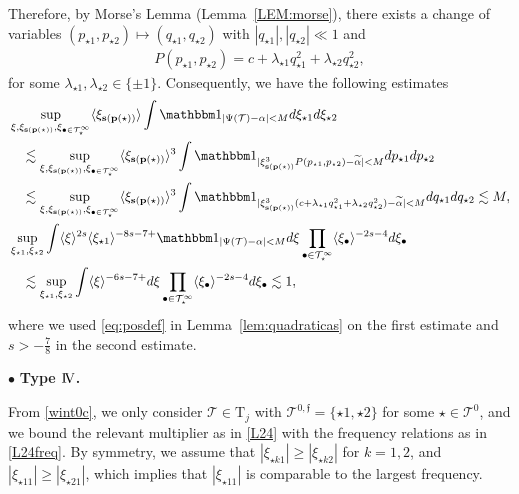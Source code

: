 \documentclass[%
11pt,  reqno]{amsart}
\newcommand{\IV}{\textup{I \hspace{-2.9mm} V}}
\newcommand{\5}{\textup{V}}
\newcommand{\noi}{\noindent}
\newcommand{\ind}{\mathbbm 1}
\newcommand{\les}{\lesssim}
\newcommand{\wt}{\widetilde}
\theoremstyle{remark}
\newcommand{\bul}{\bullet}
\newcommand{\TT}{\mathcal{T}}
\newcommand{\Tr}{\mathrm{T}}
\newcommand{\al}{\alpha}
\newcommand{\ld}{\lambda}
\newcommand{\pb}{\mathbf{p}}
\newcommand{\sbf}{\mathbf{s}}
\newcommand{\jb}[1]
{\langle #1 \rangle}
\newcommand{\ff}{\mathfrak{f}}
\numberwithin{equation}{section}
\numberwithin{theorem}{section}
\begin{document}
\noi 
 Therefore, by Morse's Lemma (Lemma~\ref{LEM:morse}), there exists a change of variables $(p_{\star1}, p_{\star2}) \mapsto (q_{\star1}, q_{\star2})$ with $|q_{\star1}|, |q_{\star2}| \ll 1$ and 
\begin{align}
    P(p_{\star1}, p_{\star2}) = c + \ld_{\star1} q_{\star1}^2 + \ld_{\star2} q_{\star2}^2, 
\end{align}
for some $\ld_{\star1}, \ld_{\star2} \in \{\pm1 \}$. Consequently, we have the following estimates
\begin{align}
    & 
    \sup_{\xi, \xi_{\sbf(\pb(\star))}, \xi_{\bul\in\TT^\infty_\star}}
     \jb{\xi_{\sbf(\pb(\star))}} 
     \int
    \ind_{|\Psi(\TT) - \al| < M } d \xi_{\star1} d\xi_{\star2} 
    \\
    &
    \quad 
    \les 
    \sup_{\xi, \xi_{\sbf(\pb(\star))}, \xi_{\bul\in\TT^\infty_\star}}
     \jb{\xi_{\sbf(\pb(\star))}}^3
     \int
    \ind_{|\xi_{\sbf(\pb(\star))}^3 P(p_{\star1}, p_{ \star2}) - \wt\al| < M } d p_{\star1} dp_{\star2} 
    \\
    &
    \quad 
    \les 
    \sup_{\xi, \xi_{\sbf(\pb(\star))}, \xi_{\bul\in\TT^\infty_\star}}
     \jb{\xi_{\sbf(\pb(\star))}}^3
     \int
    \ind_{|\xi_{\sbf(\pb(\star))}^3 ( c + \ld_{\star1} q_{\star1}^2 + \ld_{\star2} q_{\star2}^2) - \wt\al| < M } d q_{\star1} dq_{\star2} \les M , 
    \\
    &
    \sup_{\xi_{\star1}, \xi_{\star2}}
    \int 
    \jb{\xi}^{2s} \jb{\xi_{\star1}}^{-8s - 7 +} \ind_{|\Psi(\TT) - \al| < M } d \xi \prod_{\bul\in \TT^\infty_\star} \jb{\xi_\bul}^{-2s-4} d\xi_\bul 
    \\
    &
    \quad 
    \les 
    \sup_{\xi_{\star1}, \xi_{\star2}}
    \int 
    \jb{\xi}^{-6s - 7 + }  d \xi \prod_{\bul\in \TT^\infty_\star} \jb{\xi_\bul}^{-2s-4} d\xi_\bul \les 1, 
\end{align}
where we used \eqref{eq:posdef} in Lemma~\ref{lem:quadraticas} on the first estimate and $s>-\frac78$ in the second estimate. 



\medskip

\noi
$\bul$ \textbf{Type $\IV$.}

From \eqref{wint0c},
we only consider $\TT\in\Tr_j$
 with $\TT^{0,\ff} = \{\star1,\star2\}$ for some $\star \in \TT^0$, and we bound the relevant multiplier as in \eqref{L24} with the frequency relations as in \eqref{L24freq}.
By symmetry, we assume that $|\xi_{\star k1 }| \ge |\xi_{\star k 2} | $ for $k=1,2$, and $|\xi_{\star11}| \ge |\xi_{\star21}|$, which implies that $|\xi_{\star11}|$ is comparable to the largest frequency. 
\end{document}
